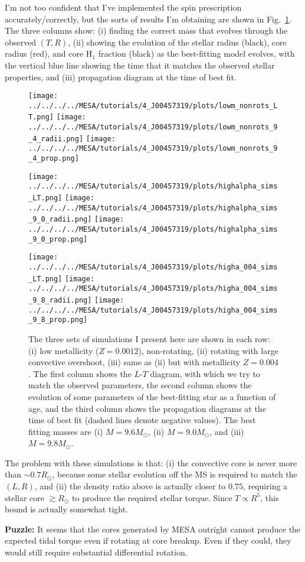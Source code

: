 \documentclass[11pt,
        usenames, %
        dvipsnames %
    ]{article}
\begin{document}
I'm not too confident that I've implemented the spin prescription
accurately/correctly, but the sorts of results I'm obtaining are shown in
Fig.~\ref{fig:2}. The three columns show: (i) finding the correct mass that
evolves through the observed $(T, R)$, (ii) showing the evolution of the stellar
radius (black), core radius (red), and core H$_1$ fraction (black) as the
best-fitting model evolves, with the vertical blue line showing the time that it
matches the observed stellar properties, and (iii) propagation diagram at the
time of best fit.
\begin{figure}
    \centering
    \texttt{[image: ../../../../MESA/tutorials/4\_J00457319/plots/lowm\_nonrots\_LT.png]}
    \texttt{[image: ../../../../MESA/tutorials/4\_J00457319/plots/lowm\_nonrots\_9\_4\_radii.png]}
    \texttt{[image: ../../../../MESA/tutorials/4\_J00457319/plots/lowm\_nonrots\_9\_4\_prop.png]}

    \texttt{[image: ../../../../MESA/tutorials/4\_J00457319/plots/highalpha\_sims\_LT.png]}
    \texttt{[image: ../../../../MESA/tutorials/4\_J00457319/plots/highalpha\_sims\_9\_0\_radii.png]}
    \texttt{[image: ../../../../MESA/tutorials/4\_J00457319/plots/highalpha\_sims\_9\_0\_prop.png]}

    \texttt{[image: ../../../../MESA/tutorials/4\_J00457319/plots/higha\_004\_sims\_LT.png]}
    \texttt{[image: ../../../../MESA/tutorials/4\_J00457319/plots/higha\_004\_sims\_9\_8\_radii.png]}
    \texttt{[image: ../../../../MESA/tutorials/4\_J00457319/plots/higha\_004\_sims\_9\_8\_prop.png]}
    \caption{The three sets of simulations I present here are shown in each row:
    (i) low metallicity ($Z = 0.0012$), non-rotating, (ii) rotating with large
    convective overshoot, (iii) same as (ii) but with metallicity $Z = 0.004$.
    The first column shows the $L$-$T$ diagram, with which we try to match the
    observed parameters, the second column shows the evolution of some
    parameters of the best-fitting star as a function of age, and the third
    column shows the propagation diagrams at the time of best fit (dashed lines
    denote negative values). The best fitting masses are (i) $M = 9.6M_{\odot}$,
    (ii) $M = 9.0M_{\odot}$, and (iii) $M = 9.8M_{\odot}$. }\label{fig:2}
\end{figure}

The problem with these simulations is that: (i) the convective core is never
more than $\sim 0.7R_{\odot}$, because some stellar evolution off the MS is
required to match the $(L, R)$, and (ii) the density ratio above is actually
closer to $0.75$, requiring a stellar core $\gtrsim R_{\odot}$ to produce the
required stellar torque. Since $T \propto R^5$, this bound is actually somewhat
tight.

\textbf{Puzzle:} It seems that the cores generated by MESA outright cannot
produce the expected tidal torque even if rotating at core breakup. Even if they
could, they would still require substantial differential rotation.
\end{document}
